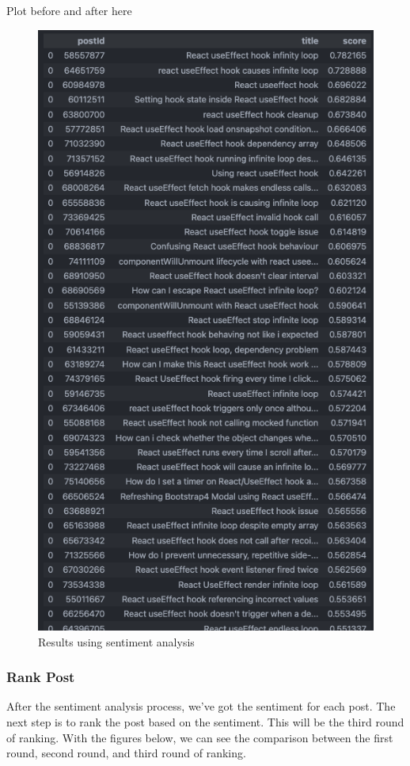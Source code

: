 Plot before and after here
\begin{figure}[H]
  \noindent \includegraphics[scale=0.45]{assets/spacy-query-1-results.png}
\caption{Results using sentiment analysis }\label{sentiment_analysis_results}
\end{figure}

\pagebreak
\subsubsection{Rank Post}
After the sentiment analysis process, we've got the sentiment for each post. The next step is to rank the post based on the sentiment. This will be the third round of ranking. With the figures below, we can see the comparison between the first round, second round, and third round of ranking.

